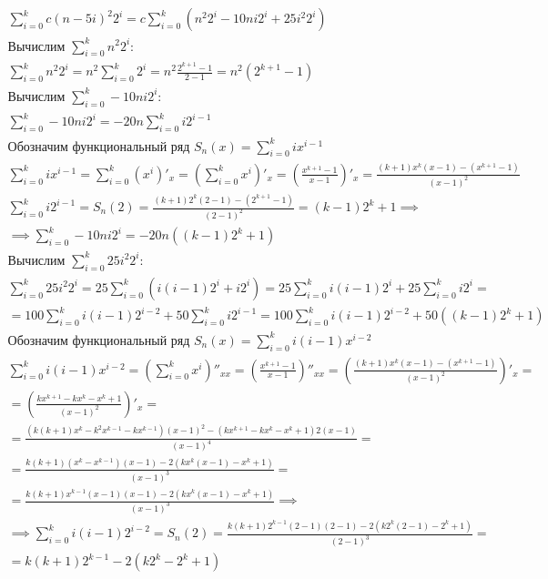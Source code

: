 \documentclass[11pt,a4paper]{article} %
\begin{document}
\begin{gather*}
\sum_{i=0}^{k} c (n - 5i)^2 2^i = c \sum_{i=0}^{k} \left( n^2 2^i - 10 ni 2^i + 25 i^2 2^i \right)
\\
\text{Вычислим } \sum_{i=0}^{k} n^2 2^i:
\\
\sum_{i=0}^{k} n^2 2^i = n^2 \sum_{i=0}^{k} 2^i =
n^2 \frac{2^{k+1} - 1} {2 - 1} =
n^2 (2^{k+1} - 1)
\\
\text{Вычислим } \sum_{i=0}^{k} -10 n i 2^i:
\\
\sum_{i=0}^{k} -10 n i 2^i = -20 n \sum_{i=0}^{k} i 2^{i - 1}
\\
\text{Обозначим функциональный ряд } S_n(x) = \sum_{i=0}^{k} i x^{i - 1}
\\
\sum_{i=0}^{k} i x^{i - 1} =
\sum_{i=0}^{k} \left( x^{i} \right)'_x =
\left( \sum_{i=0}^{k} x^{i} \right)'_x =
\left( \frac{x^{k+1} - 1}{x - 1} \right)'_x =
\frac{(k + 1) x^{k} (x - 1) - (x^{k + 1} - 1)}{(x - 1)^2} \\
\sum_{i=0}^{k} i 2^{i - 1} = S_n(2) =
\frac{(k + 1) 2^{k} (2 - 1) - (2^{k + 1} - 1)}{(2 - 1)^2} =
(k - 1) 2^k + 1 \implies \\
\implies \sum_{i=0}^{k} -10 n i 2^i = -20 n ((k - 1) 2^k + 1)
\\
\text{Вычислим } \sum_{i=0}^{k} 25 i^2 2^i:
\\
\sum_{i=0}^{k} 25 i^2 2^i =
25 \sum_{i=0}^{k} \left( i (i - 1) 2^i + i 2^i \right) =
25 \sum_{i=0}^{k} i (i - 1) 2^i + 25 \sum_{i=0}^{k} i 2^i = \\ =
100 \sum_{i=0}^{k} i (i - 1) 2^{i-2} + 50 \sum_{i=0}^{k} i 2^{i-1} =
100 \sum_{i=0}^{k} i (i - 1) 2^{i-2} + 50 ((k - 1) 2^k + 1)
\\
\text{Обозначим функциональный ряд } S_n(x) = \sum_{i=0}^{k} i (i - 1) x^{i-2}
\\
\sum_{i=0}^{k} i (i - 1) x^{i-2} =
\left( \sum_{i=0}^{k} x^{i} \right)''_{xx} =
\left( \frac{x^{k+1} - 1}{x - 1} \right)''_{xx} =
\left(\frac{(k + 1) x^{k} (x - 1) - (x^{k + 1} - 1)}{(x - 1)^2} \right)'_x = \\ =
\left(\frac{k x^{k + 1} - k x^{k} - x^{k} + 1}{(x - 1)^2} \right)'_x = \\ =
\frac{
    (k (k + 1) x^{k} - k^2 x^{k - 1} - k x^{k - 1}) (x - 1)^2
    - (k x^{k + 1} - k x^{k} - x^{k} + 1) 2 (x - 1)
}{(x - 1)^4} = \\
= \frac{
    k (k + 1) (x^{k} - x^{k - 1}) (x - 1)
    - 2 (k x^{k} (x - 1) - x^{k} + 1)
}{(x - 1)^3} = \\ = \frac{
    k (k + 1) x^{k - 1} (x - 1) (x - 1)
    - 2 (k x^{k} (x - 1) - x^{k} + 1)
}{(x - 1)^3} \implies \\
\implies
\sum_{i=0}^{k} i (i - 1) 2^{i-2} = S_n(2) = 
\frac{
    k (k + 1) 2^{k - 1} (2 - 1) (2 - 1)
    - 2 (k 2^{k} (2 - 1) - 2^{k} + 1)
}{(2 - 1)^3} = \\ =
k (k + 1) 2^{k - 1} - 2 (k 2^{k} - 2^{k} + 1) \\
\end{gather*}
\end{document}
